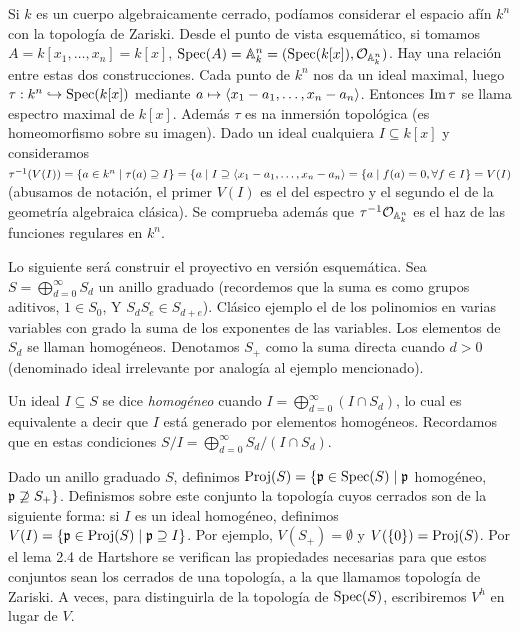 \documentclass[GA.tex]{subfiles}
\begin{document}
\begin{ej}
Si $k$ es un cuerpo algebraicamente cerrado, podíamos considerar el espacio afín $k^n$ con la topología de Zariski. Desde el punto de vista esquemático, si tomamos $A=k[x_1,\dots, x_n]=k[x]$, $\operatorname{Spec}(A)=\mathbb{A}_k^n=(\operatorname{Spec}(k[x]),{\mathcal O}_{\mathbb{A}_k^n})$. Hay una relación entre estas dos construcciones. Cada punto de $k^n$ nos da un ideal maximal, luego $\tau:k^n\hookrightarrow\operatorname{Spec}(k[x])$ mediante $a\mapsto \langle{x_1-a_1, \dots, x_n-a_n}\rangle$. Entonces $\operatorname{Im}\tau$ se llama espectro maximal de $k[x]$. Además $\tau$ es na inmersión topológica (es homeomorfismo sobre su imagen). Dado un ideal cualquiera $I\subseteq k[x]$ y consideramos $\tau^{-1}(V(I))=\{a\in k^n\mid \tau(a)\supseteq I\}=\{a\mid I\supseteq \langle{x_1-a_1, \dots, x_n-a_n}\rangle=\{a\mid f(a)=0, \forall f\in I\}=V(I)$ (abusamos de notación, el primer $V(I)$ es el del espectro y el segundo el de la geometría algebraica clásica). Se comprueba además que $\tau^{-1}{\mathcal O}_{\mathbb{A}_k^n}$ es el haz de las funciones regulares en $k^n$. 
\end{ej}

Lo siguiente será construir el proyectivo en versión esquemática. Sea $S=\bigoplus_{d=0}^{\infty}S_d$ un anillo graduado (recordemos que la suma es como grupos aditivos, $1\in S_0$, Y $S_dS_e\in S_{d+e}$). Clásico ejemplo el de los polinomios en varias variables con grado la suma de los exponentes de las variables. Los elementos de $S_d$ se llaman homogéneos. Denotamos $S_+$ como la suma directa cuando $d>0$ (denominado ideal irrelevante por analogía al ejemplo mencionado). 

\begin{defi}
Un ideal $I\subseteq S$ se dice \emph{homogéneo} cuando $I=\bigoplus_{d=0}^{\infty}(I\cap S_d)$, lo cual es equivalente a decir que $I$ está generado por elementos homogéneos. Recordamos que en estas condiciones $S/I=\bigoplus_{d=0}^{\infty}S_d/(I\cap S_d)$.
\end{defi} 

Dado un anillo graduado $S$, definimos $\operatorname{Proj}(S)=\{{\mathfrak{p}}\in\operatorname{Spec}(S)\mid {\mathfrak{p}}$ homogéneo, ${\mathfrak{p}}\not\supseteq S_+\}$. Definismos sobre este conjunto la topología cuyos cerrados son de la siguiente forma: si $I$ es un ideal homogéneo, definimos $V(I)=\{{\mathfrak{p}}\in\operatorname{Proj}(S)\mid {\mathfrak{p}}\supseteq I\}$. Por ejemplo, $V(S_+)=\emptyset$ y $V(\{0\})=\operatorname{Proj}(S)$. Por el lema 2.4 de Hartshore se verifican las propiedades necesarias para que estos conjuntos sean los cerrados de una topología, a la que llamamos topología de Zariski. A veces, para distinguirla de la topología de $\operatorname{Spec}(S)$, escribiremos $V^h$ en lugar de $V$.
\end{document}
